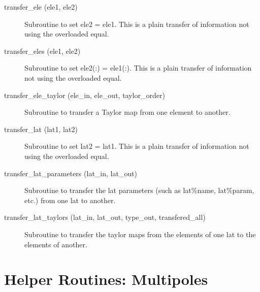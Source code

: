 \begin{description}
\item[transfer_ele (ele1, ele2)] \Newline 
     Subroutine to set ele2 = ele1. 
     This is a plain transfer of information not using the overloaded equal.

\item[transfer_eles (ele1, ele2)] \Newline 
     Subroutine to set ele2(:) = ele1(:). 
     This is a plain transfer of information not using the overloaded equal.

\item[transfer_ele_taylor (ele_in, ele_out, taylor_order)] \Newline 
     Subroutine to transfer a Taylor map from one element to another.

\item[transfer_lat (lat1, lat2)] \Newline 
     Subroutine to set lat2 = lat1. 
     This is a plain transfer of information not using the overloaded equal.

\item[transfer_lat_parameters (lat_in, lat_out)] \Newline
Subroutine to transfer the lat parameters (such as lat\%name, 
lat\%param, etc.) from one lat to another. 

\item[transfer_lat_taylors (lat_in, lat_out, 
                        type_out, transfered_all) ] \Newline 
Subroutine to transfer the taylor maps from the elements of one lat to
the elements of another. 

\end{description}

\section{Helper Routines: Multipoles}
\label{r:multi}    


